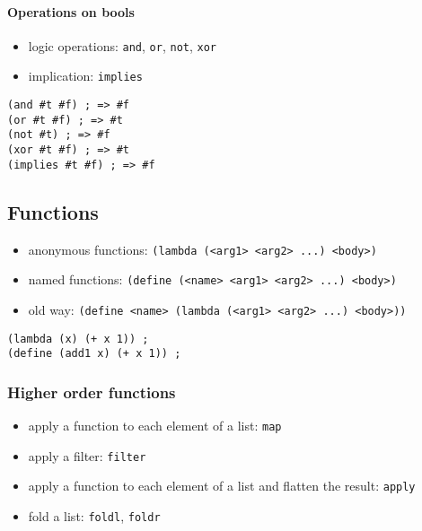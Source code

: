 \documentclass[a4paper,landscape,10pt]{article}
\begin{document}
\begin{multicols*}{2}
  \switchcolumn

  \paragraph{Operations on bools}

  \begin{itemize}
    \item logic operations: \texttt{and}, \texttt{or}, \texttt{not}, \texttt{xor}
    \item implication: \texttt{implies}
  \end{itemize}

  \begin{lstlisting}[language=Racket]
(and #t #f) ; => #f
(or #t #f) ; => #t
(not #t) ; => #f
(xor #t #f) ; => #t
(implies #t #f) ; => #f
\end{lstlisting}

  \subsection{Functions}

  \begin{itemize}
    \item anonymous functions: \texttt{(lambda (<arg1> <arg2> ...) <body>)}
    \item named functions: \texttt{(define (<name> <arg1> <arg2> ...) <body>)}
    \item old way: \texttt{(define <name> (lambda (<arg1> <arg2> ...) <body>))}
  \end{itemize}

  \begin{lstlisting}[language=Racket]
(lambda (x) (+ x 1)) ;
(define (add1 x) (+ x 1)) ;
\end{lstlisting}

  \subsubsection{Higher order functions}

  \begin{itemize}
    \item apply a function to each element of a list: \texttt{map}
    \item apply a filter: \texttt{filter}
    \item apply a function to each element of a list and flatten the result: \texttt{apply}
    \item fold a list: \texttt{foldl}, \texttt{foldr}
  \end{itemize}


\end{multicols*}
\end{document}
